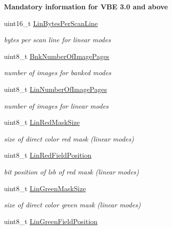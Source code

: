 \begin{Indent}{\bf Mandatory information for V\+BE 3.0 and above}\par
\begin{DoxyCompactItemize}
\item 
uint16\+\_\+t \hyperlink{structvbe__mode__info__t_a53c5060b6ac14a7418ca8421edfb9981}{Lin\+Bytes\+Per\+Scan\+Line}
\begin{DoxyCompactList}\small\item\em bytes per scan line for linear modes \end{DoxyCompactList}\item 
uint8\+\_\+t \hyperlink{structvbe__mode__info__t_a33ba903e149724b1bc99b3b8e43a7cbe}{Bnk\+Number\+Of\+Image\+Pages}
\begin{DoxyCompactList}\small\item\em number of images for banked modes \end{DoxyCompactList}\item 
uint8\+\_\+t \hyperlink{structvbe__mode__info__t_a3fa2352e69836f4b69b3a344ae761ba8}{Lin\+Number\+Of\+Image\+Pages}
\begin{DoxyCompactList}\small\item\em number of images for linear modes \end{DoxyCompactList}\item 
uint8\+\_\+t \hyperlink{structvbe__mode__info__t_a1fbcef2402fe6ce7f6c006bd50eaa6da}{Lin\+Red\+Mask\+Size}
\begin{DoxyCompactList}\small\item\em size of direct color red mask (linear modes) \end{DoxyCompactList}\item 
uint8\+\_\+t \hyperlink{structvbe__mode__info__t_aff962b58f86a77f12b412d47125a4993}{Lin\+Red\+Field\+Position}
\begin{DoxyCompactList}\small\item\em bit position of lsb of red mask (linear modes) \end{DoxyCompactList}\item 
uint8\+\_\+t \hyperlink{structvbe__mode__info__t_af235e505028771ab2fb84778f4dfb476}{Lin\+Green\+Mask\+Size}
\begin{DoxyCompactList}\small\item\em size of direct color green mask (linear modes) \end{DoxyCompactList}\item 
uint8\+\_\+t \hyperlink{structvbe__mode__info__t_a6683a63711dbc5dfb9a2a59c55deecd5}{Lin\+Green\+Field\+Position}

\end{DoxyCompactItemize}
\end{Indent}
